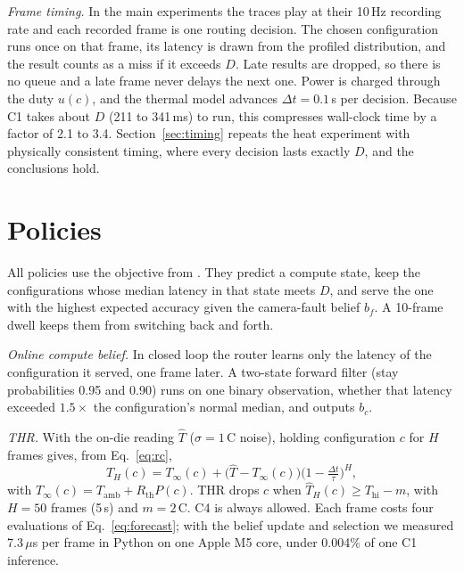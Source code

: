 \documentclass[conference,compsoc]{IEEEtran}
\newcommand{\degc}{\,\textdegree C}
\begin{document}
\textit{Frame timing.} In the main experiments the traces play at their
10\,Hz recording rate and each recorded frame is one routing decision.
The chosen configuration runs once on that frame, its latency is drawn
from the profiled distribution, and the result counts as a miss if it
exceeds $D$. Late results are dropped, so there is no queue and a late
frame never delays the next one. Power is charged through the duty
$u(c)$, and the thermal model advances $\Delta t=0.1$\,s per decision.
Because C1 takes about $D$ (211 to 341\,ms) to run, this compresses
wall-clock time by a factor of 2.1 to 3.4. Section~\ref{sec:timing}
repeats the heat experiment with physically consistent timing, where
every decision lasts exactly $D$, and the conclusions hold.

\section{Policies}
\label{sec:thr}

All policies use the objective from \cite{roy2026beliefspace}. They
predict a compute state, keep the configurations whose median latency
in that state meets $D$, and serve the one with the highest expected
accuracy given the camera-fault belief $b_f$. A 10-frame dwell keeps
them from switching back and forth.

\textit{Online compute belief.} In closed loop the router learns only
the latency of the configuration it served, one frame later. A
two-state forward filter (stay probabilities 0.95 and 0.90) runs on one
binary observation, whether that latency exceeded $1.5\times$ the
configuration's normal median, and outputs $b_c$.

\textit{THR.} With the on-die reading $\hat T$ ($\sigma=1$\degc{} noise),
holding configuration $c$ for $H$ frames gives, from
Eq.~\eqref{eq:rc},
\begin{equation}
\hat T_{H}(c) = T_{\infty}(c) + \big(\hat T - T_{\infty}(c)\big)\big(1-\tfrac{\Delta t}{\tau}\big)^{H},
\label{eq:forecast}
\end{equation}
with $T_{\infty}(c)=T_{\mathrm{amb}}+R_{\mathrm{th}}P(c)$. THR drops $c$
when $\hat T_H(c) \ge T_{\mathrm{hi}}-m$, with $H=50$ frames (5\,s) and
$m=2$\degc. C4 is always allowed. Each frame costs four evaluations of
Eq.~\eqref{eq:forecast}; with the belief update and selection we
measured 7.3\,$\mu$s per frame in Python on one Apple M5 core, under
0.004\% of one C1 inference.
\end{document}
